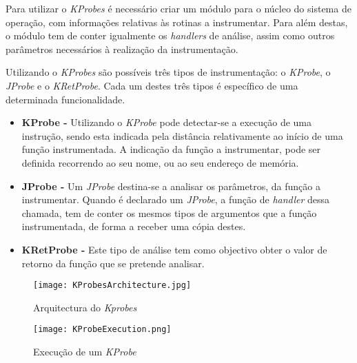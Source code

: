 Para utilizar o \textit{KProbes} é necessário criar um módulo para o núcleo do sistema de operação, com informações relativas às rotinas a instrumentar.
Para além destas, o módulo tem de conter igualmente os \textit{handlers} de análise, assim como outros parâmetros necessários à realização da instrumentação.

Utilizando o \textit{KProbes} são possíveis três tipos de instrumentação: o \textit{KProbe}, o \textit{JProbe} e o \textit{KRetProbe}.
Cada um destes três tipos é específico de uma determinada funcionalidade.

\begin{itemize}
 \item \textbf{KProbe - } Utilizando o \textit{KProbe} pode detectar-se a execução de uma instrução, sendo esta indicada pela distância relativamente ao início de uma função instrumentada.
A indicação da função a instrumentar, pode ser definida recorrendo ao seu nome, ou ao seu endereço de memória.

\item \textbf{JProbe - } Um \textit{JProbe} destina-se a analisar os parâmetros, da função a instrumentar.
Quando é declarado um \textit{JProbe}, a função de \textit{handler} dessa chamada, tem de conter os mesmos tipos de argumentos que a função instrumentada, de forma a receber uma cópia destes.
 
 \item \textbf{KRetProbe - } Este tipo de análise tem como objectivo obter o valor de retorno da função que se pretende analisar.

\end{itemize}

\begin{figure}[!htb]
       \centering
       \texttt{[image: KProbesArchitecture.jpg]}
       \caption{Arquitectura do \textit{Kprobes} \cite{KProbesLwn}}
	\label{fig:kprobes_arch}
\end{figure}

\begin{figure}[!htb]
       \centering
       \texttt{[image: KProbeExecution.png]}
       \caption{Execução de um \textit{KProbe} \cite{KProbesLwn}}
	\label{fig:kprobe_execution}
\end{figure}


